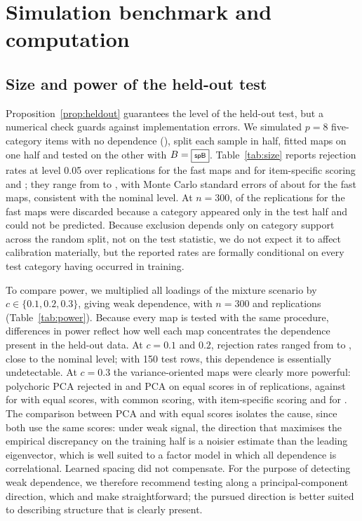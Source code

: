 \section{Simulation benchmark and computation}
\subsection{Size and power of the held-out test}
Proposition~\ref{prop:heldout} guarantees the level of the held-out test, but a numerical check guards against implementation errors. We simulated $p=8$ five-category items with no dependence (), split each sample in half, fitted maps on one half and tested on the other with $B=\fbox{\scriptsize\textsf{spB}}$. Table~\ref{tab:size} reports rejection rates at level 0.05 over \sizeReps{} replications for the fast maps and \sizeItemReps{} for item-specific scoring and ; they range from \sizeMin{} to \sizeMax{}, with Monte Carlo standard errors of about \sizeMcse{} for the fast maps, consistent with the nominal level. At $n=300$, \sizeLost{} of the \sizeReps{} replications for the fast maps were discarded because a category appeared only in the test half and could not be predicted. Because exclusion depends only on category support across the random split, not on the test statistic, we do not expect it to affect calibration materially, but the reported rates are formally conditional on every test category having occurred in training.

\begin{table}[htbp]
\centering\small
{}
\caption{Empirical size of the held-out permutation test at level 0.05 under independence.}
\label{tab:size}
\end{table}

To compare power, we multiplied all loadings of the mixture scenario by $c\in\{0.1,0.2,0.3\}$, giving weak dependence, with $n=300$ and \powReps{} replications (Table~\ref{tab:power}). Because every map is tested with the same procedure, differences in power reflect how well each map concentrates the dependence present in the held-out data. At $c=0.1$ and $0.2$, rejection rates ranged from \powWeakMin{} to \powWeakMax{}, close to the nominal level; with 150 test rows, this dependence is essentially undetectable. At $c=0.3$ the variance-oriented maps were clearly more powerful: polychoric PCA rejected in \powPoly{} and PCA on equal scores in \powPCA{} of replications, against \powLin{} for  with equal scores, \powCommon{} with common scoring, \powItem{} with item-specific scoring and \powGifi{} for . The comparison between PCA and  with equal scores isolates the cause, since both use the same scores: under weak signal, the direction that maximises the empirical discrepancy on the training half is a noisier estimate than the leading eigenvector, which is well suited to a factor model in which all dependence is correlational. Learned spacing did not compensate. For the purpose of detecting weak dependence, we therefore recommend testing along a principal-component direction, which  and  make straightforward; the pursued direction is better suited to describing structure that is clearly present.

